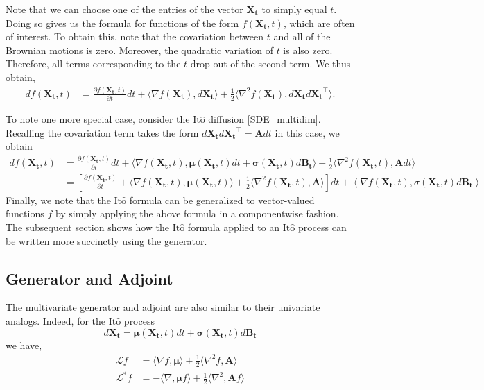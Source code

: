 \documentclass[12pt]{article}
\newcommand{\B}[1]{\boldsymbol{#1}}
\newcommand{\state}[1][t]{X_{#1}}
\newcommand{\BM}[1][t]{B_{#1}} %
\newcommand{\gen}{\mathcal{L}} %
\newcommand{\ito}{\text{It}\hat{\text{o}}}
\newcommand{\diffMat}{\mathbf{A}} %
\begin{document}
Note that we can choose one of the entries of the vector $\B\state$ to simply equal $t$. Doing so gives us the formula for functions of the form $f(\B\state, t)$, which are 
often of interest. To obtain this, note that the covariation between $t$ and all of the Brownian motions is zero. Moreover, the quadratic variation of $t$ is also zero. Therefore, 
all terms corresponding to the $t$ drop out of the second term. We thus obtain, 
\begin{align*}
df(\B\state, t) &= \frac{\partial f(\B\state,t)}{\partial t}dt  + \langle \nabla f(\B\state), d\B\state \rangle + \frac{1}{2} \langle \nabla^2 f(\B\state), d\B\state d\B\state^\top  \rangle.
\end{align*}

To note one more special case, consider the $\ito$ diffusion \ref{SDE_multidim}. Recalling the covariation term takes the form $d\B\state d\B\state^\top = \diffMat dt$ in this case, we obtain 
\begin{align}
df(\B\state, t) 
&= \frac{\partial f(\B\state,t)}{\partial t}dt + \langle \nabla f(\B\state,t), \B\mu(\B\state,t) dt + \B\sigma(\B\state,t) d\B\BM \rangle + \frac{1}{2} \langle \nabla^2 f(\B\state,t), \diffMat dt  \rangle \label{Ito_formula_diffusion} \\
&= \left[\frac{\partial f(\B\state,t)}{\partial t} + \langle \nabla f(\B\state,t), \B\mu(\B\state,t) \rangle + \frac{1}{2} \langle \nabla^2 f(\B\state,t), \diffMat \rangle \right] dt + 
\left\langle \nabla f(\B\state,t), \sigma(\B\state, t) d\B\BM  \right\rangle \nonumber
\end{align}
Finally, we note that the $\ito$ formula can be generalized to vector-valued functions $f$ by simply applying the above formula in a componentwise fashion. The subsequent 
section shows how the $\ito$ formula applied to an $\ito$ process can be written more succinctly using the generator. 

\subsection{Generator and Adjoint}
The multivariate generator and adjoint are also similar to their univariate analogs. Indeed, for the $\ito$ process 
\[
d\B\state = \B\mu(\B\state,t) dt + \B\sigma(\B\state,t) d\B\BM
\]
we have,
\begin{align*}
\gen f &= \langle \nabla f, \B\mu \rangle + \frac{1}{2} \langle \nabla^2 f, \diffMat \rangle \\
\gen^* f &= -\langle \nabla, \B\mu f \rangle + \frac{1}{2} \langle \nabla^2, \diffMat f\rangle
\end{align*}
\end{document}
